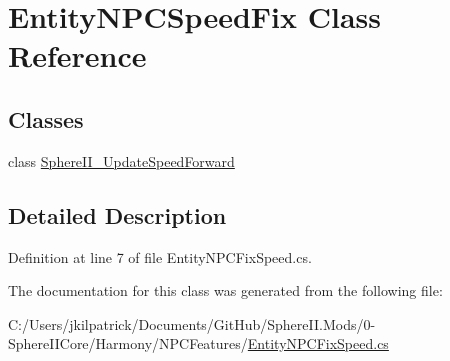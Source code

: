 \hypertarget{class_entity_n_p_c_speed_fix}{}\section{Entity\+N\+P\+C\+Speed\+Fix Class Reference}
\label{class_entity_n_p_c_speed_fix}
\subsection*{Classes}
\begin{DoxyCompactItemize}
\item 
class \mbox{\hyperlink{class_entity_n_p_c_speed_fix_1_1_sphere_i_i___update_speed_forward}{Sphere\+I\+I\+\_\+\+Update\+Speed\+Forward}}
\end{DoxyCompactItemize}


\subsection{Detailed Description}


Definition at line 7 of file Entity\+N\+P\+C\+Fix\+Speed.\+cs.



The documentation for this class was generated from the following file\+:\begin{DoxyCompactItemize}
\item 
C\+:/\+Users/jkilpatrick/\+Documents/\+Git\+Hub/\+Sphere\+I\+I.\+Mods/0-\/\+Sphere\+I\+I\+Core/\+Harmony/\+N\+P\+C\+Features/\mbox{\hyperlink{_entity_n_p_c_fix_speed_8cs}{Entity\+N\+P\+C\+Fix\+Speed.\+cs}}\end{DoxyCompactItemize}
